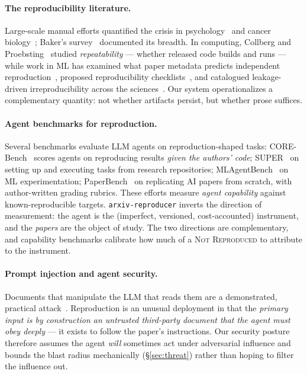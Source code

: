 \documentclass[10pt]{article}
\newcommand{\system}{\texttt{arxiv-reproducer}}
\newcommand{\verdict}[1]{\textsc{#1}}
\begin{document}
\paragraph{The reproducibility literature.} Large-scale manual efforts quantified the crisis in psychology~\cite{osc2015} and cancer biology~\cite{errington2021}; Baker's survey~\cite{baker2016} documented its breadth. In computing, Collberg and Proebsting~\cite{collberg2016} studied \emph{repeatability} --- whether released code builds and runs --- while work in ML has examined what paper metadata predicts independent reproduction~\cite{raff2019}, proposed reproducibility checklists~\cite{pineau2021}, and catalogued leakage-driven irreproducibility across the sciences~\cite{kapoor2023}. Our system operationalizes a complementary quantity: not whether artifacts persist, but whether prose suffices.

\paragraph{Agent benchmarks for reproduction.} Several benchmarks evaluate LLM agents on reproduction-shaped tasks: CORE-Bench~\cite{siegel2024} scores agents on reproducing results \emph{given the authors' code}; SUPER~\cite{bogin2024} on setting up and executing tasks from research repositories; MLAgentBench~\cite{huang2024} on ML experimentation; PaperBench~\cite{starace2025} on replicating AI papers from scratch, with author-written grading rubrics. These efforts measure \emph{agent capability} against known-reproducible targets. \system{} inverts the direction of measurement: the agent is the (imperfect, versioned, cost-accounted) instrument, and the \emph{papers} are the object of study. The two directions are complementary, and capability benchmarks calibrate how much of a \verdict{Not Reproduced} to attribute to the instrument.

\paragraph{Prompt injection and agent security.} Documents that manipulate the LLM that reads them are a demonstrated, practical attack~\cite{greshake2023}. Reproduction is an unusual deployment in that the \emph{primary input is by construction an untrusted third-party document that the agent must obey deeply} --- it exists to follow the paper's instructions. Our security posture therefore assumes the agent \emph{will} sometimes act under adversarial influence and bounds the blast radius mechanically (\S\ref{sec:threat}) rather than hoping to filter the influence out.
\end{document}
